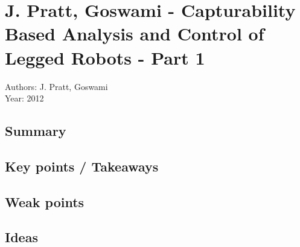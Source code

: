 \section{J. Pratt, Goswami - Capturability Based Analysis and Control of Legged Robots - Part 1 \cite{Koolen:2012:CAC:2344876.2344877}}
Authors: J. Pratt, Goswami\\
Year: 2012
\subsection*{Summary}
\subsection*{Key points / Takeaways}
\subsection*{Weak points}
\subsection*{Ideas}

